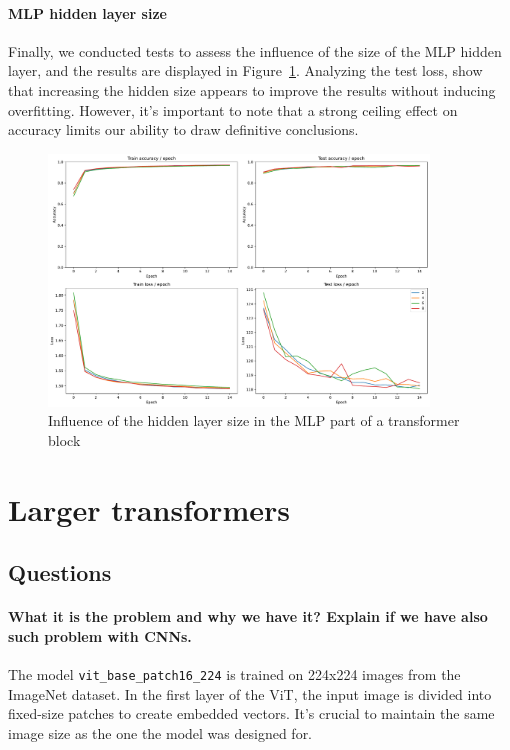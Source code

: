 \paragraph{MLP hidden layer size}
Finally, we conducted tests to assess the influence of the size of the MLP hidden layer, and the results are displayed in Figure~\ref{fig:mlp_ratio_influence}. Analyzing the test loss, show that increasing the hidden size appears to improve the results without inducing overfitting. However, it's important to note that a strong ceiling effect on accuracy limits our ability to draw definitive conclusions.

\begin{figure}[H]
    \centering
    \includegraphics*[width=0.9\textwidth]{figs/Transformers/mlp_ratio_influence.pdf}
    \caption{Influence of the hidden layer size in the MLP part of a transformer block}
    \label{fig:mlp_ratio_influence}
\end{figure}

\section{Larger transformers}
\subsection{Questions}
\paragraph{What it is the problem and why we have it? Explain if we have also such problem with CNNs.}
The model \texttt{vit\_base\_patch16\_224} is trained on 224x224 images from the ImageNet dataset. In the first layer of the ViT, the input image is divided into fixed-size patches to create embedded vectors. It's crucial to maintain the same image size as the one the model was designed for.

